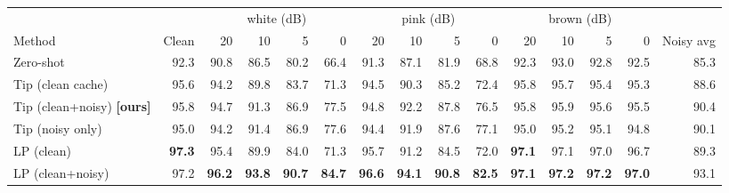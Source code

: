 \begin{tabular}{lrrrrrrrrrrrrrr}
\toprule
 & & \multicolumn{4}{c}{white (dB)} & \multicolumn{4}{c}{pink (dB)} & \multicolumn{4}{c}{brown (dB)} & \\
Method & Clean & 20 & 10 & 5 & 0 & 20 & 10 & 5 & 0 & 20 & 10 & 5 & 0 & Noisy avg \\
\midrule
Zero-shot & 92.3 & 90.8 & 86.5 & 80.2 & 66.4 & 91.3 & 87.1 & 81.9 & 68.8 & 92.3 & 93.0 & 92.8 & 92.5 & 85.3 \\
Tip (clean cache) & 95.6 & 94.2 & 89.8 & 83.7 & 71.3 & 94.5 & 90.3 & 85.2 & 72.4 & 95.8 & 95.7 & 95.4 & 95.3 & 88.6 \\
Tip (clean+noisy) \textbf{[ours]} & 95.8 & 94.7 & 91.3 & 86.9 & 77.5 & 94.8 & 92.2 & 87.8 & 76.5 & 95.8 & 95.9 & 95.6 & 95.5 & 90.4 \\
Tip (noisy only) & 95.0 & 94.2 & 91.4 & 86.9 & 77.6 & 94.4 & 91.9 & 87.6 & 77.1 & 95.0 & 95.2 & 95.1 & 94.8 & 90.1 \\
LP (clean) & \textbf{97.3} & 95.4 & 89.9 & 84.0 & 71.3 & 95.7 & 91.2 & 84.5 & 72.0 & \textbf{97.1} & 97.1 & 97.0 & 96.7 & 89.3 \\
LP (clean+noisy) & 97.2 & \textbf{96.2} & \textbf{93.8} & \textbf{90.7} & \textbf{84.7} & \textbf{96.6} & \textbf{94.1} & \textbf{90.8} & \textbf{82.5} & \textbf{97.1} & \textbf{97.2} & \textbf{97.2} & \textbf{97.0} & 93.1 \\
\bottomrule
\end{tabular}